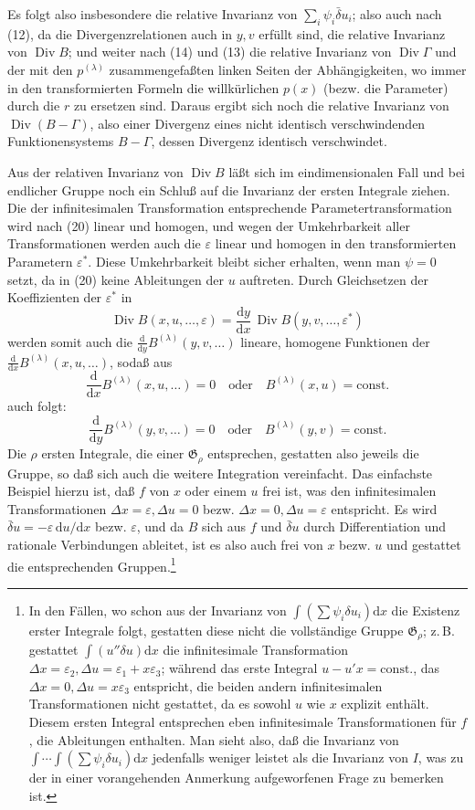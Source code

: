 \documentclass[11pt]{article}
\newcommand{\dd}{\mathrm d}
\newcommand{\Div}{\operatorname{Div}}
\newcommand{\G}{\mathfrak G}
\newcommand{\D}{\Delta}
\newcommand{\bd}{\bar{\delta}}
\newcommand{\eps}{\varepsilon}
\begin{document}
Es folgt also insbesondere die relative Invarianz von \(\sum_i\psi_i\bd u_i\); also auch nach (12), da die Divergenzrelationen auch in \(y,v\) erfüllt sind, die relative Invarianz von \(\Div B\); und weiter nach (14) und (13) die relative Invarianz von \(\Div\Gamma\) und der mit den \(p^{(\lambda)}\) zusammengefaßten linken Seiten der Abhängigkeiten, wo immer in den transformierten Formeln die willkürlichen \(p(x)\) (bezw. die Parameter) durch die \(r\) zu ersetzen sind. Daraus ergibt sich noch die relative Invarianz von \(\Div(B-\Gamma)\), also einer Divergenz eines nicht identisch verschwindenden Funktionensystems \(B-\Gamma\), dessen Divergenz identisch verschwindet.

Aus der relativen Invarianz von \(\Div B\) läßt sich im eindimensionalen Fall und bei endlicher Gruppe noch ein Schluß auf die Invarianz der ersten Integrale ziehen. Die der infinitesimalen Transformation entsprechende Parametertransformation wird nach (20) linear und homogen, und wegen der Umkehrbarkeit aller Transformationen werden auch die \(\eps\) linear und homogen in den transformierten Parametern \(\eps^*\). Diese Umkehrbarkeit bleibt sicher erhalten, wenn man \(\psi=0\) setzt, da in (20) keine Ableitungen der \(u\) auftreten. Durch Gleichsetzen der Koeffizienten der \(\eps^*\) in
\[
\Div B(x,u,\ldots,\eps)=\frac{\dd y}{\dd x}\,\Div B(y,v,\ldots,\eps^*)
\]
werden somit auch die \(\frac{\dd}{\dd y}B^{(\lambda)}(y,v,\ldots)\) lineare, homogene Funktionen der \(\frac{\dd}{\dd x}B^{(\lambda)}(x,u,\ldots)\), sodaß aus
\[
\frac{\dd}{\dd x}B^{(\lambda)}(x,u,\ldots)=0
\quad\text{oder}\quad B^{(\lambda)}(x,u)=\mathrm{const.}
\]
auch folgt:
\[
\frac{\dd}{\dd y}B^{(\lambda)}(y,v,\ldots)=0
\quad\text{oder}\quad B^{(\lambda)}(y,v)=\mathrm{const.}
\]
Die \(\rho\) ersten Integrale, die einer \(\G_\rho\) entsprechen, gestatten also jeweils die Gruppe, so daß sich auch die weitere Integration vereinfacht. Das einfachste Beispiel hierzu ist, daß \(f\) von \(x\) oder einem \(u\) frei ist, was den infinitesimalen Transformationen \(\D x=\eps,\D u=0\) bezw. \(\D x=0,\D u=\eps\) entspricht. Es wird \(\bd u=-\eps\,\dd u/\dd x\) bezw. \(\eps\), und da \(B\) sich aus \(f\) und \(\bd u\) durch Differentiation und rationale Verbindungen ableitet, ist es also auch frei von \(x\) bezw. \(u\) und gestattet die entsprechenden Gruppen.\footnote{In den Fällen, wo schon aus der Invarianz von \(\int(\sum\psi_i\delta u_i)\dd x\) die Existenz erster Integrale folgt, gestatten diese nicht die vollständige Gruppe \(\G_\rho\); z.\,B. gestattet \(\int(u''\delta u)\dd x\) die infinitesimale Transformation \(\D x=\eps_2,\D u=\eps_1+x\eps_3\); während das erste Integral \(u-u'x=\mathrm{const.}\), das \(\D x=0,\D u=x\eps_3\) entspricht, die beiden andern infinitesimalen Transformationen nicht gestattet, da es sowohl \(u\) wie \(x\) explizit enthält. Diesem ersten Integral entsprechen eben infinitesimale Transformationen für \(f\), die Ableitungen enthalten. Man sieht also, daß die Invarianz von \(\int\!\cdots\!\int(\sum\psi_i\delta u_i)\dd x\) jedenfalls weniger leistet als die Invarianz von \(I\), was zu der in einer vorangehenden Anmerkung aufgeworfenen Frage zu bemerken ist.}
\end{document}
